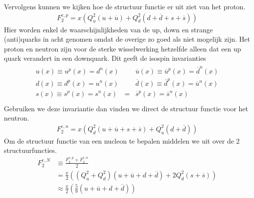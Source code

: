 \documentclass[../main.tex]{subfiles}
\begin{document}
Vervolgens kunnen we kijken hoe de structuur functie er uit ziet van het proton.
\begin{equation}
    \begin{aligned}
        \label{eq:struct_func_proton}
        F_2^{e,p} = x\left(Q_u^2(u+\overline u) + Q_d^2(d+\overline d + s + \overline s)\right)
    \end{aligned}
\end{equation}
Hier worden enkel de waarschijnlijkheden van de up, down en strange (anti)quarks in acht genomen omdat de overige zo goed als niet mogelijk zijn. Het proton en neutron zijn voor de sterke wisselwerking hetzelfde alleen dat een up quark verandert in een downquark. Dit geeft de isospin invarianties
\begin{equation}
    \begin{aligned}
        \label{eq:isospin_invariantie}
        \begin{matrix}
            u(x) \equiv u^p(x) = d^n(x) &   & \overline u(x) \equiv \overline u^p(x) = \overline d^n(x) \\
            d(x) \equiv d^p(x) = u^n(x) &   & \overline d(x) \equiv \overline d^p(x) = \overline u^n(x) \\
            s(x) \equiv s^p(x) = s^n(x) & = & \overline s^p(x) = \overline s^n(x)                       \\
        \end{matrix}
    \end{aligned}
\end{equation}
Gebruiken we deze invariantie dan vinden we direct de structuur functie voor het neutron.
\begin{equation}
    \begin{aligned}
        \label{eq:struct_func_neutron}
        F_2^{e,n} = x\left(Q_d^2(u+\overline u + s + \overline s) + Q_u^2(d+\overline d)\right)
    \end{aligned}
\end{equation}
Om de structuur functie van een nucleon te bepalen middelen we uit over de 2 structuurfuncties.
\begin{equation}
    \begin{aligned}
        \label{eq:struct_func_nucleon}
        F_2^{e,N} &\equiv \frac{F_2^{e,p}+F_2^{e,n}}{2}\\
                  &= \frac{x}{2} \left((Q_u^2+Q_d^2)(u+\overline u + d + \overline d) + 2Q_d^2(s+\overline s)\right)\\
                  &\approx \frac{x}{2} \left( \frac{5}{9} (u+\overline u + d + \overline d)\right)
    \end{aligned}
\end{equation}
\end{document}
